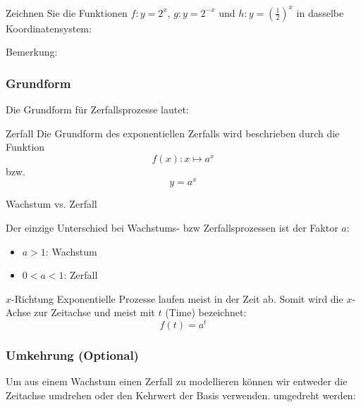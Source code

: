 \newpage



Zeichnen Sie die Funktionen $f: y=2^x$, $g: y=2^{-x}$ und $h: y=\left(\frac12\right)^x$ in dasselbe Koordinatensystem:


Bemerkung: 
\newpage

\subsubsection{Grundform} 
Die Grundform für Zerfallsprozesse lautet:

\begin{definition}{Zerfall}{}
  Die Grundform des exponentiellen Zerfalls wird beschrieben durch die Funktion
$$f(x): x \mapsto a^x$$
  bzw.
  $$y = a^x$$
\end{definition}


\begin{gesetz}{Wachstum vs. Zerfall}{}

  Der einzige Unterschied bei Wachstums- bzw Zerfallsprozessen ist der
  Faktor $a$:

  \begin{itemize}
    \item $a>1$: Wachstum
    \item $0<a<1$: Zerfall
  \end{itemize}
  
\end{gesetz}

\begin{bemerkung}{$x$-Richtung}{}
  Exponentielle Prozesse laufen meist in der Zeit ab. Somit wird
  die $x$-Achse zur Zeitachse und meist mit $t$ (Time) bezeichnet:
  $$f(t) = a^t$$
  \end{bemerkung}


\subsubsection{Umkehrung (Optional)}
Um aus einem Wachstum einen Zerfall zu modellieren können wir entweder
die Zeitachse umdrehen oder den Kehrwert der Basis verwenden.
umgedreht werden:

